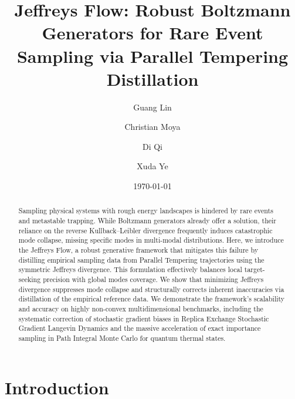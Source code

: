 \documentclass[%
 reprint,
 amsmath,amssymb,
 aps,
 pre,
]{revtex4-2}
\begin{document}
\title{Jeffreys Flow: Robust Boltzmann Generators for Rare Event Sampling via Parallel Tempering Distillation}

\author{Guang Lin}
\author{Christian Moya}
\author{Di Qi}
\author{Xuda Ye}

\date{\today}

\begin{abstract}
Sampling physical systems with rough energy landscapes is hindered by rare events and metastable trapping. While Boltzmann generators already offer a solution, their reliance on the reverse Kullback--Leibler divergence frequently induces catastrophic mode collapse, missing specific modes in multi-modal distributions. Here, we introduce the Jeffreys Flow, a robust generative framework that mitigates this failure by distilling empirical sampling data from Parallel Tempering trajectories using the symmetric Jeffreys divergence. This formulation effectively balances local target-seeking precision with global modes coverage. We show that minimizing Jeffreys divergence suppresses mode collapse and structurally corrects inherent inaccuracies via distillation of the empirical reference data. We demonstrate the framework's scalability and accuracy on highly non-convex multidimensional benchmarks, including the systematic correction of stochastic gradient biases in Replica Exchange Stochastic Gradient Langevin Dynamics and the massive acceleration of exact importance sampling in Path Integral Monte Carlo for quantum thermal states.
\end{abstract}

\maketitle

\section{Introduction}
\label{section: introduction}
\end{document}
